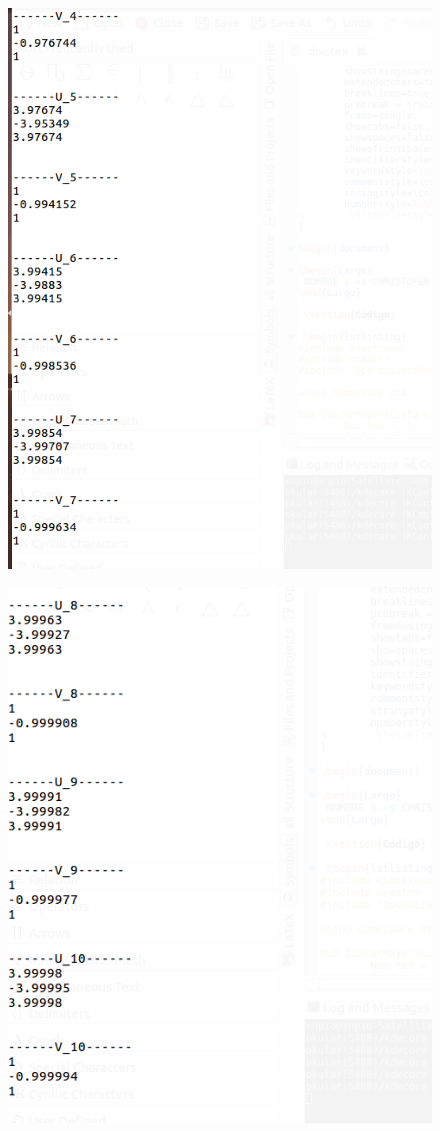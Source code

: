 \documentclass[a4paper,12pt]{article}
\begin{document}
\begin{figure}[h]
  \centering
  \includegraphics[scale = 0.4]{2.png}
\end{figure}

\begin{figure}[h]
  \centering
  \includegraphics[scale = 0.4]{3.png}
\end{figure}
\end{document}

